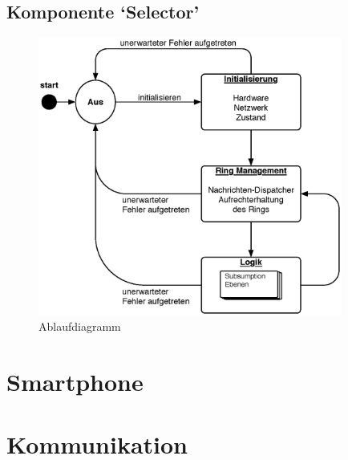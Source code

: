 \documentclass[10pt,a4paper]{article}
\let\oldsection\section
\renewcommand{\section}{\newpage \oldsection}
\begin{document}
			\subsection{Komponente `Selector'}
			
			\begin{figure}[h]
			\centering
			\includegraphics[width=10cm]{images/e-puck.eps}
  			\caption{Ablaufdiagramm}
  		\end{figure}	
	\section{Smartphone}
	\section{Kommunikation}
				
	\newpage	
	\printglossary[style=altlist,title=Glossar]
						
\end{document}
